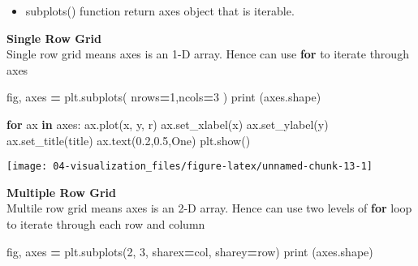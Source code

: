 \documentclass[
]{book}
\newenvironment{Shaded}{\begin{snugshade}}{\end{snugshade}}
\newcommand{\BuiltInTok}[1]{#1}
\newcommand{\ControlFlowTok}[1]{\textcolor[rgb]{0.27,0.27,0.27}{\textbf{#1}}}
\newcommand{\DecValTok}[1]{\textcolor[rgb]{0.06,0.06,0.06}{#1}}
\newcommand{\FloatTok}[1]{\textcolor[rgb]{0.06,0.06,0.06}{#1}}
\newcommand{\KeywordTok}[1]{\textcolor[rgb]{0.27,0.27,0.27}{\textbf{#1}}}
\newcommand{\NormalTok}[1]{#1}
\newcommand{\OperatorTok}[1]{\textcolor[rgb]{0.43,0.43,0.43}{\textbf{#1}}}
\newcommand{\StringTok}[1]{\textcolor[rgb]{0.5,0.5,0.5}{#1}}
\providecommand{\tightlist}{%
  \setlength{\itemsep}{0pt}\setlength{\parskip}{0pt}}
\begin{document}
\begin{itemize}
\tightlist
\item
  subplots() function return axes object that is iterable.
\end{itemize}

\textbf{Single Row Grid}\\
Single row grid means axes is an 1-D array. Hence can use \textbf{for} to iterate through axes

\begin{Shaded}
\begin{Highlighting}[]
\NormalTok{fig, axes }\OperatorTok{=}\NormalTok{ plt.subplots( nrows}\OperatorTok{=}\DecValTok{1}\NormalTok{,ncols}\OperatorTok{=}\DecValTok{3}\NormalTok{ )}
\BuiltInTok{print}\NormalTok{ (axes.shape)}
\end{Highlighting}
\end{Shaded}

\begin{Shaded}
\begin{Highlighting}[]
\ControlFlowTok{for}\NormalTok{ ax }\KeywordTok{in}\NormalTok{ axes:}
\NormalTok{    ax.plot(x, y, }\StringTok{\textquotesingle{}r\textquotesingle{}}\NormalTok{)}
\NormalTok{    ax.set\_xlabel(}\StringTok{\textquotesingle{}x\textquotesingle{}}\NormalTok{)}
\NormalTok{    ax.set\_ylabel(}\StringTok{\textquotesingle{}y\textquotesingle{}}\NormalTok{)}
\NormalTok{    ax.set\_title(}\StringTok{\textquotesingle{}title\textquotesingle{}}\NormalTok{)}
\NormalTok{    ax.text(}\FloatTok{0.2}\NormalTok{,}\FloatTok{0.5}\NormalTok{,}\StringTok{\textquotesingle{}One\textquotesingle{}}\NormalTok{)}
\NormalTok{plt.show()}
\end{Highlighting}
\end{Shaded}

\texttt{[image: 04-visualization\_files/figure-latex/unnamed-chunk-13-1]}

\textbf{Multiple Row Grid}\\
Multile row grid means axes is an 2-D array. Hence can use two levels of \textbf{for} loop to iterate through each row and column

\begin{Shaded}
\begin{Highlighting}[]
\NormalTok{fig, axes }\OperatorTok{=}\NormalTok{ plt.subplots(}\DecValTok{2}\NormalTok{, }\DecValTok{3}\NormalTok{, sharex}\OperatorTok{=}\StringTok{\textquotesingle{}col\textquotesingle{}}\NormalTok{, sharey}\OperatorTok{=}\StringTok{\textquotesingle{}row\textquotesingle{}}\NormalTok{)}
\BuiltInTok{print}\NormalTok{ (axes.shape)}
\end{Highlighting}
\end{Shaded}
\end{document}
